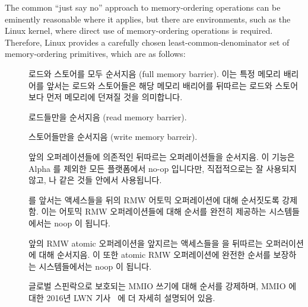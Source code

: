 The common ``just say no'' approach to memory-ordering operations
can be eminently reasonable where it applies,
but there are environments, such as the Linux kernel, where direct
use of memory-ordering operations is required.
Therefore,
Linux provides a carefully chosen least-common-denominator
set of memory-ordering primitives, which are as follows:
\fi
\begin{description}
\item	[] 로드와 스토어를 모두 순서지음 (full memory barrier).
	이는 특정 메모리 배리어를 앞서는 로드와 스토어들은 해당 메모리 배리어를
	뒤따르는 로드와 스토어보다 먼저 메모리에 던져질 것을 의미합니다.
\item	[] 로드들만을 순서지음 (read memory barrier).
\item	[] 스토어들만을 순서지음 (write memory barreir).
\item	[] 앞의 오퍼레이션들에 의존적인
	뒤따르는 오퍼레이션들을 순서지음.
	이 기능은 Alpha 를 제외한 모든 플랫폼에서 no-op 입니다만, 직접적으로는
	잘 사용되지 않고,  나  같은 것들
	안에서 사용됩니다.
\item	[]  를 앞서는
	액세스들을 뒤의 RMW 어토믹 오퍼레이션에 대해 순서짓도록 강제함.
	이는 어토믹 RMW 오퍼레이션들에 대해 순서를 완전히 제공하는
	시스템들에서는 noop 이 됩니다.
\item	[] 앞의 RMW atomic 오퍼레이션을 앞지르는
	액세스들을  을 뒤따르는 오퍼러이션에 대해
	순서지음.
	이 또한 atomic RMW 오퍼레이션에 완전한 순서를 보장하는 시스템들에서는
	noop 이 됩니다.
\item	[] 글로벌 스핀락으로 보호되는 MMIO 쓰기에 대해 순서를
	강제하며, MMIO 에 대한 2016년 LWN
	기사~\cite{PaulEMcKenney2016LinuxKernelMMIO} 에 더 자세히 설명되어
	있음.
\iffalse
	

\end{description}
